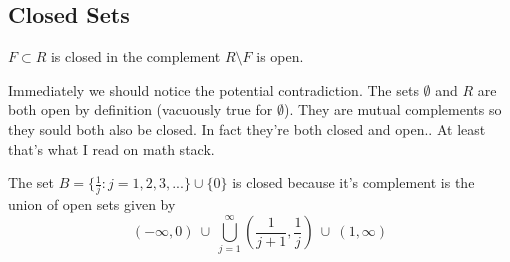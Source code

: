 \documentclass{article}
\begin{document}
\pagebreak
\subsection*{Closed Sets}

\begin{definition}
    \( F \subset R \) is closed in the complement \( R \setminus F \) is open.
\end{definition}

Immediately we should notice the potential contradiction. The sets \( \emptyset \)
and \( R \) are both open by definition (vacuously true for \( \emptyset \)). 
They are mutual complements so they sould both also be closed. In fact
they're both closed and open.. At least that's what I read on math stack.

\begin{exmp}
    The set \( B = \{\frac{1}{j} : j = 1, 2, 3, ...\} \cup \{0\}\) is closed because it's 
    complement is the union of open sets given by
    \[
        (-\infty, 0) \ \cup  \ \bigcup_{j=1}^\infty (\frac{1}{j+1}, \frac{1}{j}) \ \cup  \ (1, \infty)
    \]
\end{exmp}

\begin{theorem}
    
\end{theorem}
\end{document}
